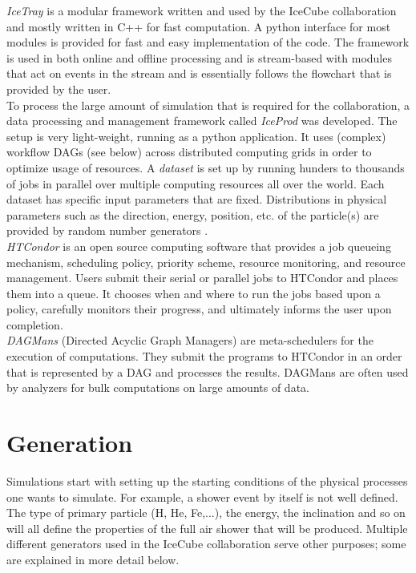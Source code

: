 \begin{corollary}
\textit{IceTray}  is a modular framework written and used by the IceCube collaboration and mostly written in C++ for fast computation. A python interface for most modules is provided for fast and easy implementation of the code. The framework is used in both online and offline processing and is stream-based with modules that act on events in the stream and is essentially follows the flowchart that is provided by the user.\\

\noindent To process the large amount of simulation that is required for the collaboration, a data processing and management framework called \textit{IceProd} was developed. The setup is very light-weight, running as a python application. It uses (complex) workflow DAGs (see below) across distributed computing grids in order to optimize usage of resources. A \textit{dataset} is set up by running hunders to thousands of jobs in parallel over multiple computing resources all over the world. Each dataset has specific input parameters that are fixed. Distributions in physical parameters such as the direction, energy, position, etc. of the particle(s) are provided by random number generators \cite{1742-6596-664-6-062056}.\\

\noindent \textit{HTCondor} is an open source computing software that provides a job queueing mechanism, scheduling policy, priority scheme, resource monitoring, and resource management. Users submit their serial or parallel jobs to HTCondor and places them into a queue. It chooses when and where to run the jobs based upon a policy, carefully monitors their progress, and ultimately informs the user upon completion.\\

\noindent \textit{DAGMans} (Directed Acyclic Graph Managers) are meta-schedulers for the execution of computations. They submit the programs to HTCondor in an order that is represented by a DAG and processes the results. DAGMans are often used by analyzers for bulk computations on large amounts of data.
\end{corollary}

\section{Generation}
Simulations start with setting up the starting conditions of the physical processes one wants to simulate. For example, a shower event by itself is not well defined. The type of primary particle (H, He, Fe,...), the energy, the inclination and so on will all define the properties of the full air shower that will be produced. Multiple different generators used in the IceCube collaboration serve other purposes; some are explained in more detail below.

